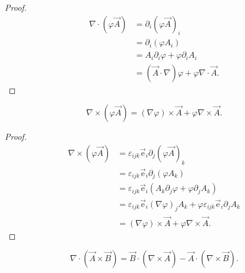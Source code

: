 \begin{proof}
\begin{equation}
\begin{split}
\nabla\cdot\left(\varphi\vec{A}\right)
&=\partial_i\left(\varphi \vec{A}\right)_i \\
&=\partial_i\left(\varphi A_i\right) \\
&=A_i\partial_i \varphi + \varphi\partial_i A_i \\
&=\left(\vec{A}\cdot\nabla\right)\varphi + \varphi\nabla\cdot\vec{A}.
\end{split}
\end{equation}
\end{proof}

\begin{example}
\begin{equation}
\nabla\times\left(\varphi\vec{A}\right)
=(\nabla\varphi)\times\vec{A} + \varphi \nabla\times\vec{A}.
\end{equation}
\end{example}

\begin{proof}
\begin{equation}
\begin{split}
\nabla\times(\varphi\vec{A})
&=\varepsilon_{ijk}\vec{\mathrm{e}}_i\partial_j \left(\varphi\vec{A}\right)_k \\
&=\varepsilon_{ijk}\vec{\mathrm{e}}_i \partial_j(\varphi A_k) \\
&=\varepsilon_{ijk}\vec{\mathrm{e}}_i (A_k\partial_j \varphi + \varphi\partial_j A_k) \\
&=\varepsilon_{ijk} \vec{\mathrm{e}}_i(\nabla\varphi)_j A_k + \varphi \varepsilon_{ijk} \vec{\mathrm{e}}_i \partial_j A_k \\
&=(\nabla\varphi)\times \vec{A} + \varphi \nabla\times\vec{A} .
\end{split}
\end{equation}
\end{proof}

\begin{example}
\begin{equation}
\nabla\cdot \left(\vec{A}\times\vec{B} \right)
=\vec{B}\cdot\left(\nabla\times\vec{A}\right)-\vec{A}\cdot\left(\nabla\times\vec{B}\right).
\end{equation}
\end{example}


